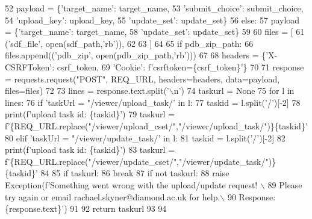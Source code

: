 \begin{DoxyCode}
52         payload = \{\textcolor{stringliteral}{'target\_name'}: target\_name,
53                    \textcolor{stringliteral}{'submit\_choice'}: submit\_choice,
54                    \textcolor{stringliteral}{'upload\_key'}: upload\_key,
55                    \textcolor{stringliteral}{'update\_set'}: update\_set\}
56     \textcolor{keywordflow}{else}:
57         payload = \{\textcolor{stringliteral}{'target\_name'}: target\_name,
58                    \textcolor{stringliteral}{'update\_set'}: update\_set\}
59 
60     files = [
61         (\textcolor{stringliteral}{'sdf\_file'}, open(sdf\_path,\textcolor{stringliteral}{'rb'})),
62         
63     ]
64     
65     \textcolor{keywordflow}{if} pdb\_zip\_path:
66         files.append((\textcolor{stringliteral}{'pdb\_zip'}, open(pdb\_zip\_path,\textcolor{stringliteral}{'rb'})))
67 
68     headers = \{\textcolor{stringliteral}{'X-CSRFToken'}: csrf\_token,
69               \textcolor{stringliteral}{'Cookie'}: f\textcolor{stringliteral}{'csrftoken=\{csrf\_token\}'}\}
70     
71     response = requests.request(\textcolor{stringliteral}{"POST"}, REQ\_URL, headers=headers, data=payload, files=files)
72     
73     lines = response.text.split(\textcolor{stringliteral}{'\(\backslash\)n'})
74     taskurl = \textcolor{keywordtype}{None}
75     \textcolor{keywordflow}{for} l \textcolor{keywordflow}{in} lines:
76         \textcolor{keywordflow}{if} \textcolor{stringliteral}{'taskUrl = "/viewer/upload\_task/'} \textcolor{keywordflow}{in} l:
77             taskid = l.split(\textcolor{stringliteral}{'/'})[-2]
78             print(f\textcolor{stringliteral}{'upload task id: \{taskid\}'})
79             taskurl = f\textcolor{stringliteral}{'\{REQ\_URL.replace("/viewer/upload\_cset/","/viewer/upload\_task/")\}\{taskid\}'}
80         \textcolor{keywordflow}{elif} \textcolor{stringliteral}{'taskUrl = "/viewer/update\_task/'} \textcolor{keywordflow}{in} l:
81             taskid = l.split(\textcolor{stringliteral}{'/'})[-2]
82             print(f\textcolor{stringliteral}{'upload task id: \{taskid\}'})
83             taskurl = f\textcolor{stringliteral}{'\{REQ\_URL.replace("/viewer/update\_cset/","/viewer/update\_task/")\}\{taskid\}'}
84 
85             \textcolor{keywordflow}{if} taskurl:
86                 \textcolor{keywordflow}{break}
87     \textcolor{keywordflow}{if} \textcolor{keywordflow}{not} taskurl:
88         \textcolor{keywordflow}{raise} Exception(f\textcolor{stringliteral}{'Something went wrong with the upload/update request! \(\backslash\)}
89 \textcolor{stringliteral}{                        Please try again or email rachael.skyner@diamond.ac.uk for help.\(\backslash\)}
90 \textcolor{stringliteral}{                        Response: \{response.text\}'})
91 
92     \textcolor{keywordflow}{return} taskurl
93 
94 
\end{DoxyCode}


